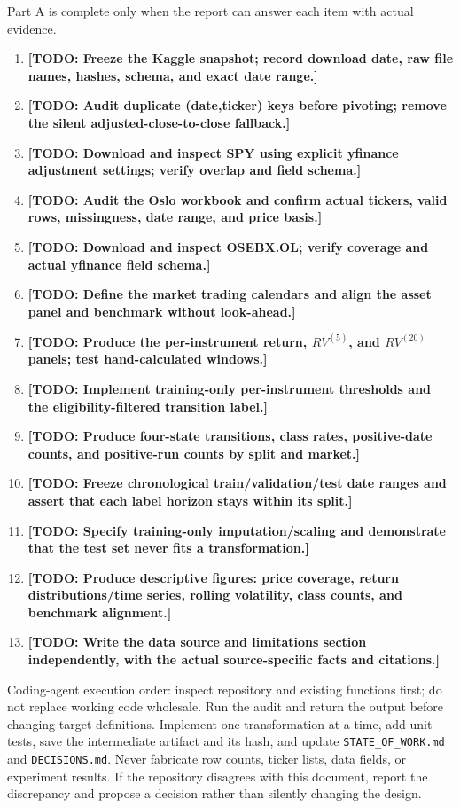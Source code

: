 \documentclass[11pt,a4paper]{article}
\newcommand{\todo}[1]{\textcolor{red!75!black}{\textbf{[TODO: #1]}}}
\begin{document}
Part A is complete only when the report can answer each item with actual evidence.

\begin{enumerate}[label=\textbf{A\arabic*.},leftmargin=1.6cm]
  \item \todo{Freeze the Kaggle snapshot; record download date, raw file names, hashes, schema, and exact date range.}
  \item \todo{Audit duplicate (date,ticker) keys before pivoting; remove the silent adjusted-close-to-close fallback.}
  \item \todo{Download and inspect SPY using explicit yfinance adjustment settings; verify overlap and field schema.}
  \item \todo{Audit the Oslo workbook and confirm actual tickers, valid rows, missingness, date range, and price basis.}
  \item \todo{Download and inspect OSEBX.OL; verify coverage and actual yfinance field schema.}
  \item \todo{Define the market trading calendars and align the asset panel and benchmark without look-ahead.}
  \item \todo{Produce the per-instrument return, $RV^{(5)}$, and $RV^{(20)}$ panels; test hand-calculated windows.}
  \item \todo{Implement training-only per-instrument thresholds and the eligibility-filtered transition label.}
  \item \todo{Produce four-state transitions, class rates, positive-date counts, and positive-run counts by split and market.}
  \item \todo{Freeze chronological train/validation/test date ranges and assert that each label horizon stays within its split.}
  \item \todo{Specify training-only imputation/scaling and demonstrate that the test set never fits a transformation.}
  \item \todo{Produce descriptive figures: price coverage, return distributions/time series, rolling volatility, class counts, and benchmark alignment.}
  \item \todo{Write the data source and limitations section independently, with the actual source-specific facts and citations.}
\end{enumerate}

\begin{agentbox}
Coding-agent execution order: inspect repository and existing functions first; do not replace working code wholesale. Run the audit and return the output before changing target definitions. Implement one transformation at a time, add unit tests, save the intermediate artifact and its hash, and update \texttt{STATE\_OF\_WORK.md} and \texttt{DECISIONS.md}. Never fabricate row counts, ticker lists, data fields, or experiment results. If the repository disagrees with this document, report the discrepancy and propose a decision rather than silently changing the design.
\end{agentbox}
\end{document}
